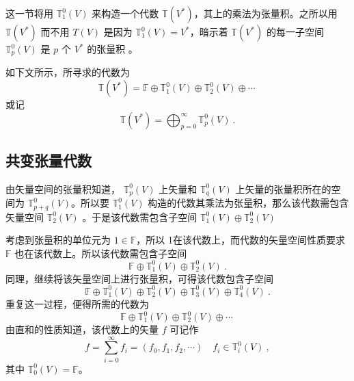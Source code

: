 
\begin{issues}
\iss
\end{issues}


这一节将用 $\mathbb T_1^0(V)$ 来构造一个代数 $\mathbb T(V^*)$，其上的乘法为张量积。之所以用 $\mathbb T(V^*)$ 而不用 $T(V)$ 是因为 $\mathbb T_1^0(V)=V^*$，暗示着 $\mathbb T(V^*)$ 的每一子空间 $\mathbb T_p^0(V)$ 是 $p$ 个 $V^*$ 的张量积 。 

如下文所示，所寻求的代数为
\begin{equation}
\mathbb T(V^*)=\mathbb F\oplus\mathbb T_1^0(V)\oplus\mathbb T_2^0(V)\oplus\cdots~
\end{equation}
或记
\begin{equation}
\mathbb T(V^*)=\bigoplus_{p=0}^\infty\mathbb T_p^0(V)~.
\end{equation}
\subsection{共变张量代数}
由矢量空间的张量积知道， $\mathbb T_p^0(V)$ 上矢量和 $\mathbb T_q^0(V)$ 上矢量的张量积所在的空间为  $\mathbb T_{p+q}^0(V)$。所以要 $\mathbb T_1^0(V)$ 构造的代数其乘法为张量积，那么该代数需包含矢量空间 $\mathbb T_2^0(V)$ 。于是该代数需包含子空间 $\mathbb T_1^0(V)\oplus\mathbb T_2^0(V) $

 考虑到张量积的单位元为 $1\in\mathbb F$，所以 1在该代数上，而代数的矢量空间性质要求 $\mathbb F$ 也在该代数上。所以该代数需包含子空间
\begin{equation}
\mathbb F\oplus\mathbb T_1^0(V)\oplus\mathbb T_2^0(V) ~.
\end{equation} 
同理，继续将该矢量空间上进行张量积，可得该代数包含子空间
\begin{equation}
\mathbb F\oplus\mathbb T_1^0(V)\oplus\mathbb T_2^0(V)\oplus\mathbb T_3^0(V)\oplus\mathbb T_4^0(V)~.
\end{equation}
重复这一过程，便得所需的代数为
\begin{equation}
\mathbb F\oplus\mathbb T_1^0(V)\oplus\mathbb T_2^0(V)\oplus\cdots~
\end{equation}
由直和的性质知道，该代数上的矢量 $f$ 可记作
\begin{equation}\label{eq_TenAlg_5}
f=\sum_{i=0}^\infty f_i=(f_0,f_1,f_2,\cdots) \quad f_i\in\mathbb T_i^0(V)~,
\end{equation}
其中 $\mathbb T_0^0(V)=\mathbb F$。

